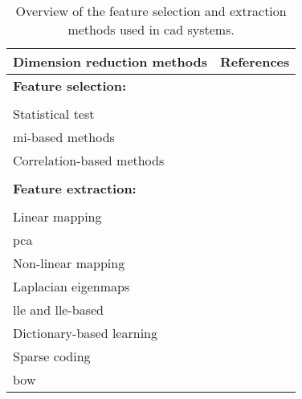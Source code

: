 \begin{table}
  \caption{Overview of the feature selection and extraction methods used in \acs*{cad} systems.}
  \scriptsize
  \centering
  \begin{tabular}{l r}
    \toprule
    \textbf{Dimension reduction methods} & \textbf{References} \\
    \midrule
    \textbf{Feature selection:} & \\ \\ [-1.5ex]
    \quad Statistical test & \cite{Niaf2011,Niaf2012,Vos2012} \\
    \quad \ac{mi}-based methods & \cite{Niaf2011,Niaf2012,Vos2008,lehaire2014computer,khalvati2015automated,chung2015prostate} \\
    \quad Correlation-based methods & \cite{rampun2016computer,rampun2015computer} \\ \\ [-1.5ex]
    \textbf{Feature extraction:} & \\ \\ [-1.5ex]
    \quad Linear mapping & \\
    \quad \quad \acs*{pca} & \cite{Tiwari2008,Tiwari2009} \\
    \quad Non-linear mapping & \\
    \quad \quad Laplacian eigenmaps & \cite{Tiwari2007,Tiwari2009a,Tiwari2009,Tiwari2010,Viswanath2008,Viswanath2011} \\
    \quad \quad \acs*{lle} and \acs*{lle}-based & \cite{Tiwari2008,Tiwari2009,Viswanath2008a,Viswanath2008} \\
    \quad Dictionary-based learning & \\
    \quad \quad Sparse coding & \cite{lehaire2014computer} \\
    \quad \quad \acs*{bow} & \cite{rampun2016computerb,rampun2015classifying} \\
    \bottomrule
  \end{tabular}
\label{tab:featext}
\end{table} 
